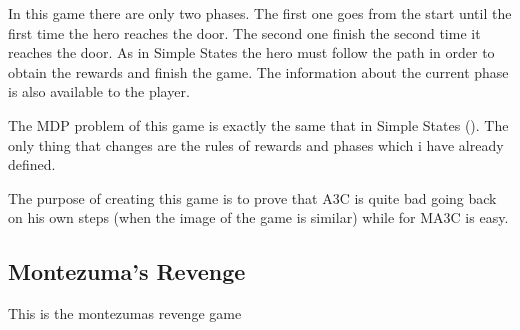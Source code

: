 In this game there are only two phases.
The first one goes from the start until the first time the hero reaches the door.
The second one finish the second time it reaches the door.
As in Simple States the hero must follow the path in order to obtain the rewards and finish the game.
The information about the current phase is also available to the player.

The \ac{MDP} problem of this game is exactly the same that in Simple States ().
The only thing that changes are the rules of rewards and phases which i have already defined.

The purpose of creating this game is to prove that \ac{A3C} is quite bad going back on his own steps (when the image of the
game is similar) while for \ac{MA3C} is easy.

\subsection{Montezuma's Revenge\label{subsection:MontezumasRevenge}}
This is the montezumas revenge game

